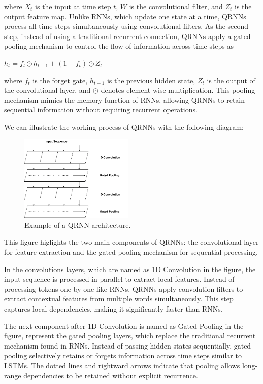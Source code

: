 \documentclass[10pt]{article}
\begin{document}
\begin{description}
where $X_t$ is the input at time step $t$, $W$ is the convolutional filter, and $Z_t$ is the output feature map. 
Unlike RNNs, which update one state at a time, QRNNs process all time steps simultaneously using convolutional filters. 
As the second step, instead of using a traditional recurrent connection, QRNNs apply a gated pooling mechanism to control the flow of information across time steps as

\begin{center}
    $h_t = f_t \odot h_{t-1} + (1 - f_t) \odot Z_t$
\end{center}

where $f_t$ is the forget gate, $h_{t-1}$ is the previous hidden state, $Z_t$ is the output of the convolutional layer, and $\odot$ denotes element-wise multiplication.
This pooling mechanism mimics the memory function of RNNs, allowing QRNNs to retain sequential information without requiring recurrent operations.

We can illustrate the working process of QRNNs with the following diagram:

\begin{figure}[h]
    \centering
    \includegraphics[width=0.48\textwidth]{QRNN_figure.png}
    \caption{Example of a QRNN architecture.}
\end{figure}

This figure higlights the two main components of QRNNs: the convolutional layer for feature extraction and the gated pooling mechanism for sequential processing.

In the convolutions layers, which are named as 1D Convolution in the figure, the input sequence is processed in parallel to extract local features.
Instead of processing tokens one-by-one like RNNs, QRNNs apply convolution filters to extract contextual features from multiple words simultaneously.
This step captures local dependencies, making it significantly faster than RNNs.

The next component after 1D Convolution is named as Gated Pooling in the figure, represent the gated pooling layers, which replace the traditional recurrent mechanism found in RNNs.
Instead of passing hidden states sequentially, gated pooling selectively retains or forgets information across time steps similar to LSTMs.
The dotted lines and rightward arrows indicate that pooling allows long-range dependencies to be retained without explicit recurrence.


\end{description}
\end{document}
